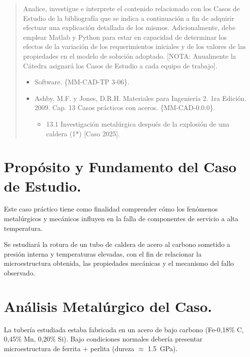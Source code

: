 \documentclass[12pt,a4paper]{article}
\begin{document}

\newpage
\tableofcontents

\begin{abstract}
    Analice, investigue e interprete el contenido relacionado con los Casos de Estudio de la bibliografía que se indica a continuación a fin de adquirir efectuar una explicación detallada de los mismos. Adicionalmente, debe emplear Matlab y Python para estar en capacidad de determinar los efectos de la variación de los requerimientos iniciales y de los valores de las propiedades en el modelo de solución adoptado. [NOTA: Anualmente la Cátedra asignará los Casos de Estudio a cada equipo de trabajo].
    \begin{itemize}
        \item Software. \{MM-CAD-TP 3-06\}.
        \item Ashby, M.F. y Jones, D.R.H. Materiales para Ingeniería 2. 1ra Edición. 2009. Cap. 13 Casos prácticos con aceros. \{MM-CAD-0.0.0\}.
        \begin{itemize}
            \item 13.1 Investigación metalúrgica después de la explosión de una caldera (1*) [Caso 2025].
        \end{itemize}
    \end{itemize}
\end{abstract}

\section{Propósito y Fundamento del Caso de Estudio.}

Este caso práctico tiene como finalidad comprender cómo los fenómenos metalúrgicos y mecánicos influyen en la falla de componentes de servicio a alta temperatura.

Se estudiará la rotura de un tubo de caldera de acero al carbono sometido a presión interna y temperaturas elevadas, con el fin de relacionar la microestructura obtenida, las propiedades mecánicas y el mecanismo del fallo observado.

\section{Análisis Metalúrgico del Caso.}
La tubería estudiada estaba fabricada en un acero de bajo carbono (Fe-0,18\% C, 0,45\% Mn, 0,20\% Si). Bajo condiciones normales debería presentar microestructura de ferrita $+$ perlita (dureza $\approx$ \SI{1,5}{\giga\pascal}).
\end{document}
